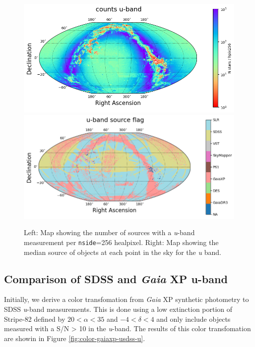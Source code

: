 \begin{figure}
    \includegraphics[width=0.48\linewidth]{./figures/source_density_maps/u-band_counts_full.png}
    \includegraphics[width=0.48\linewidth]{./figures/source_survey_maps/u-band_source.png}
    \caption{Left: Map showing the number of sources with a \textit{u}-band measurement per \texttt{nside}=256 healpixel.
    Right: Map showing the median source of objects at each point in the sky for the \textit{u} band.}
    \label{fig:monster-u}
\end{figure}

\subsection{Comparison of SDSS and \emph{Gaia} XP u-band}
Initially, we derive a color transfomation from \emph{Gaia} XP synthetic photometry to SDSS \textit{u}-band measurements. 
This is done using a low extinction portion of Stripe-82 defined by $20 < \alpha < 35$ and $-4 < \delta < 4$ and only include objects measured with a S/N > 10 in the \textit{u}-band. 
The results of this color transfomation are showin in Figure \ref{fig:color-gaiaxp-usdss-u}. 

